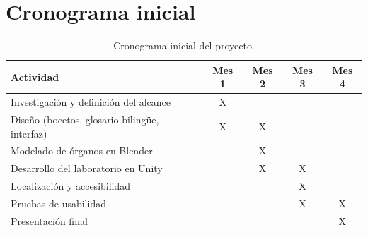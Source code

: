 \documentclass[11pt,a4paper]{article}
\begin{document}
\section{Cronograma inicial}
\begin{table}[h]
\centering
{}
\begin{tabular}{l c c c c}
\toprule
\textbf{Actividad} & \textbf{Mes 1} & \textbf{Mes 2} & \textbf{Mes 3} & \textbf{Mes 4} \\
\midrule
Investigación y definición del alcance & X & & & \\
Diseño (bocetos, glosario bilingüe, interfaz) & X & X & & \\
Modelado de órganos en Blender & & X & & \\
Desarrollo del laboratorio en Unity & & X & X & \\
Localización y accesibilidad & & & X & \\
Pruebas de usabilidad & & & X & X \\
Presentación final & & & & X \\
\bottomrule
\end{tabular}
\caption{Cronograma inicial del proyecto.}
\end{table}

\end{document}
